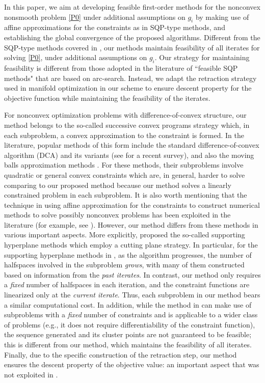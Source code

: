 \documentclass[10pt]{article}
\numberwithin{equation}{section}
\begin{document}
In this paper, we aim at developing feasible first-order methods for the nonconvex nonsmooth problem \eqref{P0} under additional assumptions on $g_i$ by making use of affine approximations for the constraints as in SQP-type methods, and establishing the global convergence of the proposed algorithms. Different from the SQP-type methods covered in \cite{Au13,BoPau16}, our methods maintain feasibility of all iterates for solving \eqref{P0}, under additional assumptions on $g_i$. Our strategy for maintaining feasibility is different from those adopted in the literature of ``feasible SQP methods" that are based on arc-search. Instead, we adapt the retraction strategy used in manifold optimization \cite{ChenMA20,ChenZM19} in our scheme to ensure descent property for the objective function while maintaining the feasibility of the iterates.

{\color{black} For nonconvex optimization problems with difference-of-convex structure, our method belongs to
the so-called successive convex programs strategy which, in each subproblem, a convex approximation to the constraint is formed. In the literature, popular methods of this form include the standard difference-of-convex algorithm (DCA) and its variants (see \cite{DCA18} for a recent survey), and also the moving balls approximation methods \cite{Au13,AuSheTeb10,BoPau16,YuLP20}. For these methods, their subproblems involve quadratic or general convex constraints which are, in general, harder to solve comparing to our proposed method because our method solves a linearly constrained problem in each subproblem. It is also worth mentioning that the technique in using affine approximation for the constraints to construct numerical methods to solve possibly nonconvex problems has been exploited in the literature  (for example, see \cite{Veinott,AckOli16,AcDeJa21}). However, our method differs from these methods in various important aspects. More explicitly, \cite{Veinott,AckOli16} proposed the so-called supporting hyperplane methods which employ a cutting plane strategy. In particular, for the supporting hyperplane methods in \cite{Veinott,AckOli16}, as the algorithm progresses, the number of halfspaces involved in the subproblem {\em grows}, with many of them constructed based on information from the \emph{past iterates}. In contrast, our method only requires a {\it fixed} number of halfspaces in each iteration, and the constraint functions are linearized only at the \emph{current iterate}. {\color{black} Thus, each subproblem in our method bears a similar computational cost. In addition, while the method in \cite{AcDeJa21} can make use of subproblems with a {\em fixed} number of constraints and is applicable to a wider class of problems (e.g., it does not require differentiability of the constraint function), the sequence generated and its cluster points are not guaranteed to be feasible; this is different from our method, which maintains the feasibility of all iterates. Finally,} due to the specific construction of the retraction step, our method ensures the descent property of the objective value: an important aspect that was not exploited in \cite{Veinott,AckOli16,AcDeJa21}.
}
\end{document}
